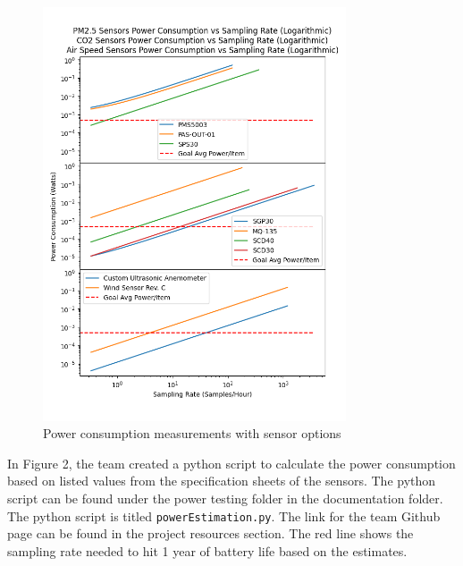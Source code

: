 \\
\begin{figure}[H]
    \centering
    \includegraphics[width=0.8\textwidth]{Pictures/image (1).png}
    \caption[Power consumption measurements with sensor options]{Power consumption measurements with sensor options} 
    \label{fig:part1commrin}
\end{figure}
In Figure 2, the team created a python script to calculate the power consumption based on listed values from the specification sheets of the sensors. The python script can be found under the power testing folder in the documentation folder. The python script is titled \texttt{powerEstimation.py}. The link for the team Github page can be found in the project resources section. The red line shows the sampling rate needed to hit 1 year of battery life based on the estimates. \\
\\
\\
